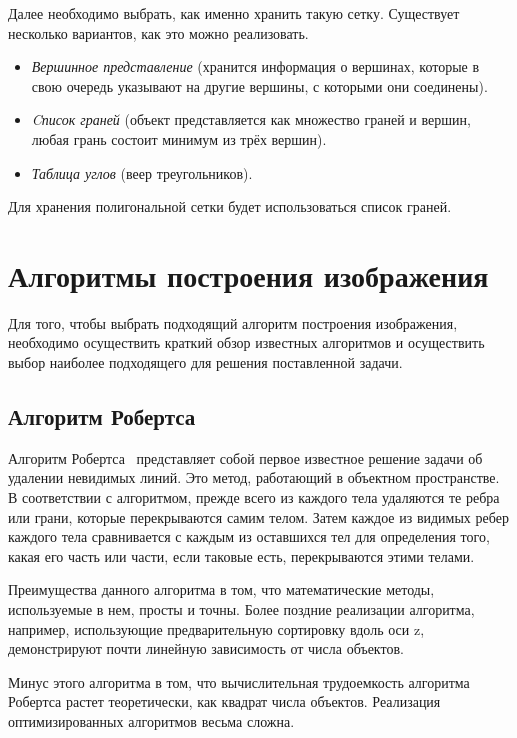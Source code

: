 Далее необходимо выбрать, как именно хранить такую сетку. Существует несколько вариантов, как это можно реализовать.

\begin{itemize}[label=---]
    \item \textit{Вершинное представление} (хранится информация о вершинах, которые в свою очередь указывают на другие вершины, с которыми они соединены).
    \item \textit{Cписок граней} (объект представляется как множество граней и вершин, любая грань состоит минимум из трёх вершин).
    \item \textit{Таблица углов} (веер треугольников).
\end{itemize}

Для хранения полигональной сетки будет использоваться список граней.

\section{Алгоритмы построения изображения}

Для того, чтобы выбрать подходящий алгоритм построения изображения, необходимо осуществить краткий обзор известных алгоритмов и осуществить выбор наиболее подходящего для решения поставленной задачи.

\subsection{Алгоритм Робертса}

Алгоритм Робертса~\cite{math_cg} представляет собой первое известное решение задачи об удалении невидимых линий. Это метод, работающий в объектном пространстве. В соответствии с алгоритмом, прежде всего из каждого тела удаляются те ребра или грани, которые перекрываются самим телом. Затем каждое из видимых ребер каждого тела сравнивается с каждым из оставшихся тел для определения того, какая его часть или части, если таковые есть, перекрываются этими телами.

Преимущества данного алгоритма в том, что математические методы, используемые в нем, просты и точны. Более поздние реализации алгоритма, например, использующие предварительную сортировку вдоль оси z, демонстрируют почти линейную зависимость от числа объектов.

Минус этого алгоритма в том, что вычислительная трудоемкость алгоритма Робертса растет теоретически, как квадрат числа объектов. Реализация оптимизированных алгоритмов весьма сложна.

